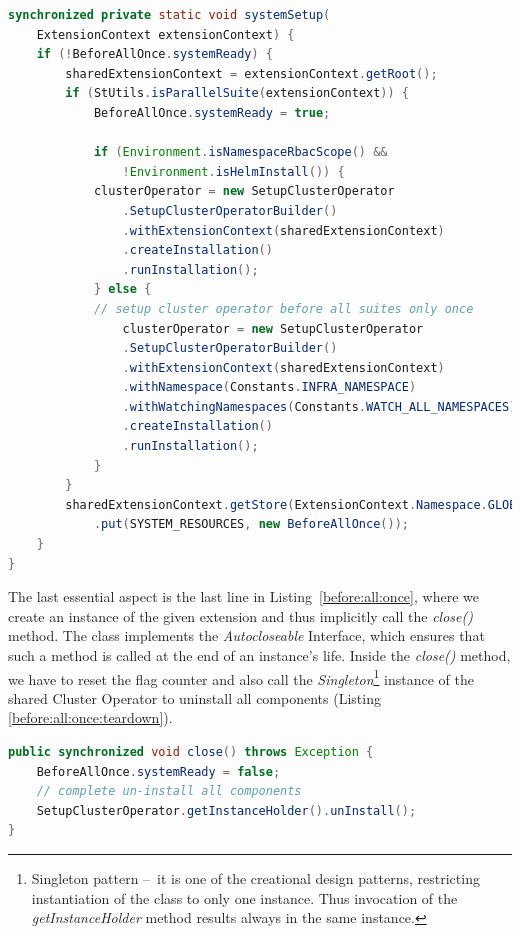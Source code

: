 \begin{lstlisting}[language= Java,label=before:all:once,caption=Setup phase of shared Cluster Operator,frame=tb]
synchronized private static void systemSetup(
    ExtensionContext extensionContext) {
    if (!BeforeAllOnce.systemReady) {
        sharedExtensionContext = extensionContext.getRoot();
        if (StUtils.isParallelSuite(extensionContext)) {
            BeforeAllOnce.systemReady = true;

            if (Environment.isNamespaceRbacScope() &&
                !Environment.isHelmInstall()) {
            clusterOperator = new SetupClusterOperator
                .SetupClusterOperatorBuilder()
                .withExtensionContext(sharedExtensionContext)
                .createInstallation()
                .runInstallation();
            } else {
            // setup cluster operator before all suites only once
                clusterOperator = new SetupClusterOperator
                .SetupClusterOperatorBuilder()
                .withExtensionContext(sharedExtensionContext)
                .withNamespace(Constants.INFRA_NAMESPACE)
                .withWatchingNamespaces(Constants.WATCH_ALL_NAMESPACES)
                .createInstallation()
                .runInstallation();
            }
        }
        sharedExtensionContext.getStore(ExtensionContext.Namespace.GLOBAL)
            .put(SYSTEM_RESOURCES, new BeforeAllOnce());
    }
}
\end{lstlisting}
The last essential aspect is the last line in Listing~\ref{before:all:once}, where we create an instance of the given
extension and thus implicitly call the \emph{close()} method.
The class implements the \emph{Autocloseable} Interface, which ensures that such a method is called at the end of an instance's life.
Inside the \emph{close()} method, we have to reset the flag counter and also call the
\emph{Singleton}\footnote{Singleton pattern \---\ it is one of the creational design patterns, restricting instantiation of the class to only one instance.
Thus invocation of the \emph{getInstanceHolder} method results always in the same instance.} instance of the shared Cluster Operator
to uninstall all components (Listing \ref{before:all:once:teardown}).


\begin{lstlisting}[language= Java,label=before:all:once:teardown,caption=Teardown phase of shared Cluster Operator,frame=tb]
public synchronized void close() throws Exception {
    BeforeAllOnce.systemReady = false;
    // complete un-install all components
    SetupClusterOperator.getInstanceHolder().unInstall();
}
\end{lstlisting}

